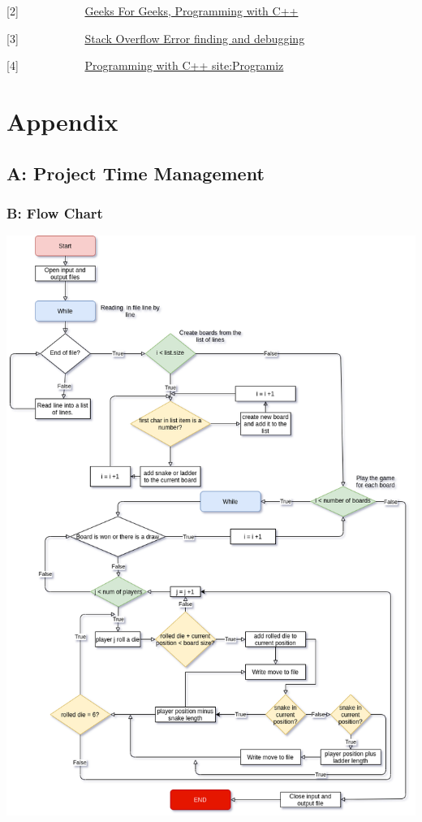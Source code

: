 [2] \ \ \ \ \ \ \ \ \ \ \   \href{geeksforgeeks.org}{Geeks For Geeks, Programming with C++}

[3] \ \ \ \ \ \ \ \ \ \ \   \href{https://www.overleaf.com/learn/latex/Bibliography_management_in_LaTeX#Further_reading}{Stack Overflow Error finding and debugging}

[4] \ \ \ \ \ \ \ \ \ \ \   \href{https://www.programiz.com/cpp-programming}{Programming with C++ site:Programiz}

\newpage
\section*{Appendix}

\subsection*{A: Project Time Management}

\newpage
\subsubsection*{B: Flow Chart}
\includegraphics[scale=0.5]{SnL.png}



 

